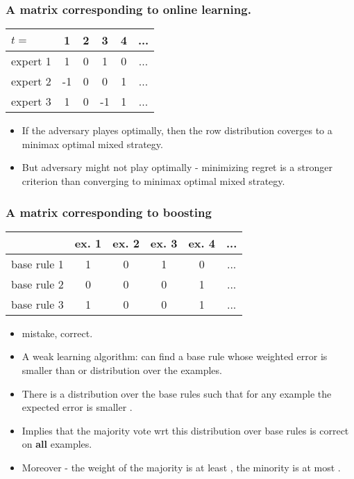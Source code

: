 \documentclass[handout]{beamer}
\begin{document}
\begin{frame}
\frametitle{A matrix corresponding to online learning.}
\begin{center}
\begin{tabular}{l|c|c|c|c|c|}
  $t=$   & 1  & 2 & 3 & 4 & ... \\
\hline
expert 1 & 1  & 0 & 1 & 0 & ...\\
\hline
expert 2 & -1 & 0 & 0 & 1 & ...\\
\hline
expert 3 &  1 & 0 & -1 & 1 & ...\\
\hline
\end{tabular}
\end{center}

\begin{itemize}
\item If the adversary playes optimally, then the row distribution
  coverges to a minimax optimal mixed strategy.
\item But adversary might not play optimally - minimizing regret is a
  stronger criterion than converging to minimax optimal mixed strategy.
\end{itemize}
\end{frame}


\begin{frame}
\frametitle{A matrix corresponding to boosting}

\begin{center}
\begin{tabular}{l|c|c|c|c|c|}
    & ex. 1  & ex. 2 & ex. 3 & ex. 4 & ... \\
\hline
base rule 1 & 1  & 0 & 1 & 0 & ...\\
\hline
base rule 2 & 0 & 0 & 0 & 1 & ...\\
\hline
base rule 3 &  1 & 0 & 0 & 1 & ...\\
\hline
\end{tabular}
\end{center}

\begin{itemize}
\item {} mistake,  correct.
\item A weak learning algorithm: can find a base rule whose weighted error is
  smaller than  or  distribution over the examples.
\item There is a distribution over the base rules such that for any
  example the expected error is smaller .
\item Implies that the majority vote wrt this distribution over base
  rules is correct on {\bf all} examples.
\item Moreover - the weight of the majority is at least
  , the minority is at most .
\end{itemize}

\end{frame}
\end{document}
